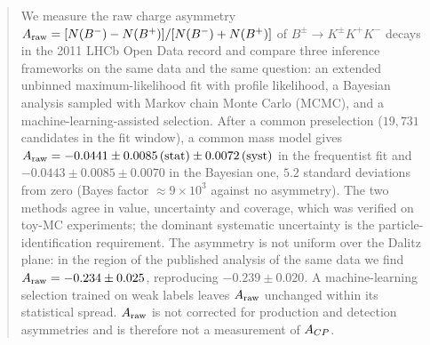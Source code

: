 \begin{abstract}
We measure the raw charge asymmetry $\Araw=[N(B^-)-N(B^+)]/[N(B^-)+N(B^+)]$ of $B^{\pm}\to K^{\pm}K^{+}K^{-}$ decays in the 2011 LHCb Open Data record and compare three inference frameworks on the same data and the same question: an extended unbinned maximum-likelihood fit with profile likelihood, a Bayesian analysis sampled with Markov chain Monte Carlo (MCMC), and a machine-learning-assisted selection. After a common preselection ($19{,}731$ candidates in the fit window), a common mass model gives $\Araw=-0.0441\pm0.0085\,(\text{stat})\pm0.0072\,(\text{syst})$ in the frequentist fit and $-0.0443\pm0.0085\pm0.0070$ in the Bayesian one, $5.2$ standard deviations from zero (Bayes factor $\approx9\times10^3$ against no asymmetry). The two methods agree in value, uncertainty and coverage, which was verified on toy-MC experiments; the dominant systematic uncertainty is the particle-identification requirement. The asymmetry is not uniform over the Dalitz plane: in the region of the published analysis of the same data we find $\Araw=-0.234\pm0.025$, reproducing $-0.239\pm0.020$. A machine-learning selection trained on weak labels leaves $\Araw$ unchanged within its statistical spread. $\Araw$ is not corrected for production and detection asymmetries and is therefore not a measurement of $\ACP$.
\end{abstract}
